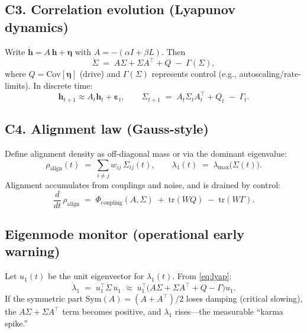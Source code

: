 \documentclass[11pt]{article}
\begin{document}
\subsection*{C3. Correlation evolution (Lyapunov dynamics)}
Write $\dot{\mathbf h}=A\,\mathbf h+\boldsymbol\eta$ with $A=-(\alpha I+\beta L)$. Then
\begin{equation}
\dot{\Sigma}\;=\;A\Sigma + \Sigma A^\top + Q \;-\; \Gamma(\Sigma),
\label{eq:lyap}
\end{equation}
where $Q=\mathrm{Cov}[\boldsymbol\eta]$ (drive) and $\Gamma(\Sigma)$ represents control (e.g., autoscaling/rate-limits). In discrete time:
\begin{equation}
\mathbf h_{t+1} \approx A_t \mathbf h_t + \boldsymbol\varepsilon_t,\qquad
\Sigma_{t+1} \;=\; A_t \Sigma_t A_t^\top + Q_t \;-\; \Gamma_t.
\end{equation}

\subsection*{C4. Alignment law (Gauss-style)}
Define alignment density as off-diagonal mass or via the dominant eigenvalue:
\begin{equation}
\rho_{\text{align}}(t) \;=\; \sum_{i\ne j} w_{ij}\,\Sigma_{ij}(t),
\qquad
\lambda_1(t) \;=\; \lambda_{\max}\big(\Sigma(t)\big).
\end{equation}
Alignment accumulates from couplings and noise, and is drained by control:
\begin{equation}
\frac{d}{dt}\,\rho_{\text{align}} \;=\; \Phi_{\text{coupling}}(A,\Sigma) \;+\; \mathrm{tr}(WQ)\;-\;\mathrm{tr}(W\Gamma).
\end{equation}

\subsection*{Eigenmode monitor (operational early warning)}
Let $u_1(t)$ be the unit eigenvector for $\lambda_1(t)$. From \eqref{eq:lyap}:
\begin{equation}
\dot\lambda_1 \;=\; u_1^\top \dot\Sigma\, u_1 
\;\approx\; u_1^\top\!\big(A\Sigma+\Sigma A^\top + Q - \Gamma\big)u_1.
\end{equation}
If the symmetric part $\mathrm{Sym}(A)=(A{+}A^\top)/2$ loses damping (critical slowing), the $A\Sigma+\Sigma A^\top$ term becomes positive, and $\lambda_1$ rises---the measurable ``karma spike.''
\end{document}
